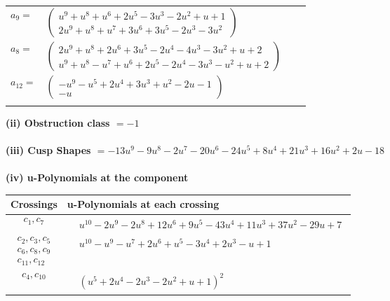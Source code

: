 \documentclass[1p]{elsarticle_modified}
\theoremstyle{definition}
\begin{document}
\begin{tabular}{m{7pt} m{180pt} m{7pt} m{180pt} }
\flushright $a_{9}=$&$\begin{pmatrix}u^9+u^8+u^6+2 u^5-3 u^3-2 u^2+u+1\\2 u^9+u^8+u^7+3 u^6+3 u^5-2 u^3-3 u^2\end{pmatrix}$ \\
\flushright $a_{8}=$&$\begin{pmatrix}2 u^9+u^8+2 u^6+3 u^5-2 u^4-4 u^3-3 u^2+u+2\\u^9+u^8- u^7+u^6+2 u^5-2 u^4-3 u^3- u^2+u+2\end{pmatrix}$ \\
\flushright $a_{12}=$&$\begin{pmatrix}- u^9- u^5+2 u^4+3 u^3+u^2-2 u-1\\- u\end{pmatrix}$\\&\end{tabular}
\flushleft \textbf{(ii) Obstruction class $= -1$}\\~\\
\flushleft \textbf{(iii) Cusp Shapes $= -13 u^9-9 u^8-2 u^7-20 u^6-24 u^5+8 u^4+21 u^3+16 u^2+2 u-18$}\\~\\
\newpage\renewcommand{\arraystretch}{1}
\flushleft \textbf{(iv) u-Polynomials at the component}\newline \\
\begin{tabular}{m{50pt}|m{274pt}}
Crossings & \hspace{64pt}u-Polynomials at each crossing \\
\hline $$\begin{aligned}c_{1},c_{7}\end{aligned}$$&$\begin{aligned}
&u^{10}-2 u^9-2 u^8+12 u^6+9 u^5-43 u^4+11 u^3+37 u^2-29 u+7
\end{aligned}$\\
\hline $$\begin{aligned}c_{2},c_{3},c_{5}\\c_{6},c_{8},c_{9}\\c_{11},c_{12}\end{aligned}$$&$\begin{aligned}
&u^{10}- u^9- u^7+2 u^6+u^5-3 u^4+2 u^3- u+1
\end{aligned}$\\
\hline $$\begin{aligned}c_{4},c_{10}\end{aligned}$$&$\begin{aligned}
&(u^5+2 u^4-2 u^3-2 u^2+u+1)^2
\end{aligned}$\\
\hline
\end{tabular}\\~\\
\end{document}
